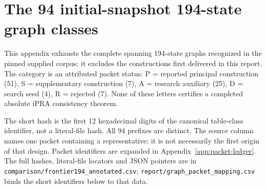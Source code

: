 \section{The 94 initial-snapshot 194-state graph classes}

\label{app:frontier194}

This appendix exhausts the complete spanning 194-state graphs recognized in the pinned supplied corpus; it excludes the constructions first delivered in this report. The category is an attributed packet status: P = reported principal construction (51), S = supplementary construction (7), A = research auxiliary (25), D = search seed (4), R = rejected (7). None of these letters certifies a completed absolute iPRA consistency theorem.

The short hash is the first 12 hexadecimal digits of the canonical table-class identifier, not a literal-file hash. All 94 prefixes are distinct. The source column names one packet containing a representative; it is not necessarily the first origin of that design. Packet identifiers are expanded in Appendix~\ref{app:packet-ledger}. The full hashes, literal-file locators and JSON pointers are in \nolinkurl{comparison/frontier194_annotated.csv}; \nolinkurl{report/graph_packet_mapping.csv} binds the short identifiers below to that data.
\begingroup
\footnotesize
\setlength{\tabcolsep}{2pt}
\setlength{\LTleft}{0pt}
\setlength{\LTright}{0pt}
\renewcommand{\arraystretch}{1.12}
